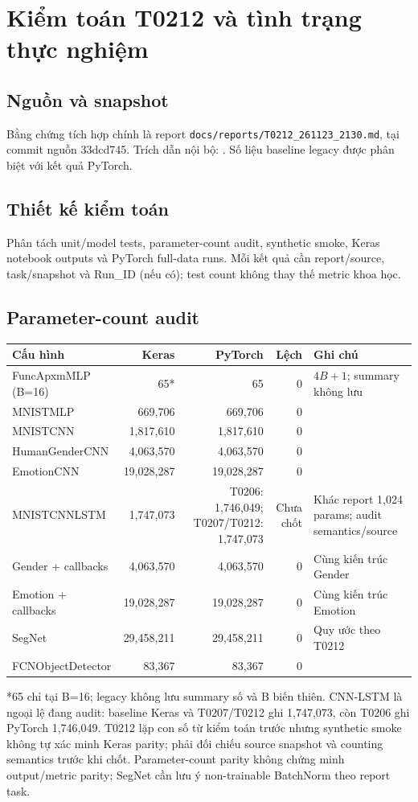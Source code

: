 \chapter{Kiểm toán T0212 và tình trạng thực nghiệm}
\section{Nguồn và snapshot}
Bằng chứng tích hợp chính là report \texttt{docs/reports/T0212\_261123\_2130.md}, tại commit nguồn 33dcd745. Trích dẫn nội bộ: \cite{btl03_t0212_internal}. Số liệu baseline legacy được phân biệt với kết quả PyTorch.

\section{Thiết kế kiểm toán}
Phân tách unit/model tests, parameter-count audit, synthetic smoke, Keras notebook outputs và PyTorch full-data runs. Mỗi kết quả cần report/source, task/snapshot và Run_ID (nếu có); test count không thay thế metric khoa học.

\section{Parameter-count audit}
\begin{longtable}{p{}r r r p{}}
\toprule Cấu hình & Keras & PyTorch & Lệch & Ghi chú \\
\midrule
FuncApxmMLP (B=16) & 65* & 65 & 0 & $4B+1$; summary không lưu \\
MNISTMLP & 669,706 & 669,706 & 0 & \\
MNISTCNN & 1,817,610 & 1,817,610 & 0 & \\
HumanGenderCNN & 4,063,570 & 4,063,570 & 0 & \\
EmotionCNN & 19,028,287 & 19,028,287 & 0 & \\
MNISTCNNLSTM & 1,747,073 & T0206: 1,746,049; T0207/T0212: 1,747,073 & Chưa chốt & Khác report 1,024 params; audit semantics/source \\
Gender + callbacks & 4,063,570 & 4,063,570 & 0 & Cùng kiến trúc Gender \\
Emotion + callbacks & 19,028,287 & 19,028,287 & 0 & Cùng kiến trúc Emotion \\
SegNet & 29,458,211 & 29,458,211 & 0 & Quy ước theo T0212 \\
FCNObjectDetector & 83,367 & 83,367 & 0 & \\
\bottomrule
\end{longtable}
*65 chỉ tại B=16; legacy không lưu summary số và B biến thiên. CNN-LSTM là ngoại lệ đang audit: baseline Keras và T0207/T0212 ghi 1,747,073, còn T0206 ghi PyTorch 1,746,049. T0212 lặp con số từ kiểm toán trước nhưng synthetic smoke không tự xác minh Keras parity; phải đối chiếu source snapshot và counting semantics trước khi chốt. Parameter-count parity không chứng minh output/metric parity; SegNet cần lưu ý non-trainable BatchNorm theo report task.

